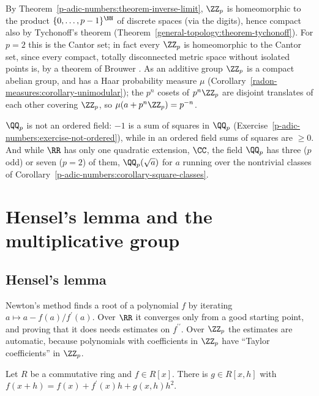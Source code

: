 \begin{remark}\label{p-adic-numbers:remark-cantor}
By Theorem~\ref{p-adic-numbers:theorem-inverse-limit}, $\ZZ_p$ is homeomorphic to the product $\{0, \ldots, p - 1\}^{\NN}$ of discrete spaces (via the digits), hence compact also by Tychonoff's theorem
(Theorem~\ref{general-topology:theorem-tychonoff}). For $p = 2$ this is the Cantor set; in fact every $\ZZ_p$ is homeomorphic to the Cantor set, since every compact, totally disconnected metric space
without isolated points is, by a theorem of Brouwer \cite{engelking-general-topology}. As an additive group $\ZZ_p$ is a compact abelian group, and has a Haar probability measure $\mu$ (Corollary~\ref{radon-measures:corollary-unimodular}); the $p^n$ cosets of $p^n\ZZ_p$ are disjoint
translates of each other covering $\ZZ_p$, so $\mu(a + p^n\ZZ_p) = p^{-n}$.
\end{remark}

\begin{counterexample}\label{p-adic-numbers:counterexample-q-p-not-ordered}
$\QQ_p$ is not an ordered field: $-1$ is a sum of squares in $\QQ_p$ (Exercise~\ref{p-adic-numbers:exercise-not-ordered}), while in an ordered field sums of squares are $\geq 0$. And while $\RR$ has only one quadratic extension, $\CC$, the field $\QQ_p$ has three
($p$ odd) or seven ($p = 2$) of them, $\QQ_p(\sqrt{a})$ for $a$ running over the nontrivial classes of Corollary~\ref{p-adic-numbers:corollary-square-classes}.
\end{counterexample}

\section{Hensel's lemma and the multiplicative group}\label{p-adic-numbers:section-hensel}

\subsection{Hensel's lemma}\label{p-adic-numbers:subsection-hensel}

Newton's method finds a root of a polynomial $f$ by iterating $a \mapsto a - f(a)/f^{\prime}(a)$. Over $\RR$ it converges only from a good starting point, and proving that it does needs estimates on
$f^{\prime\prime}$. Over $\ZZ_p$ the estimates are automatic, because polynomials with coefficients in $\ZZ_p$ have ``Taylor coefficients'' in $\ZZ_p$.

\begin{lemma}\label{p-adic-numbers:lemma-taylor}
Let $R$ be a commutative ring and $f \in R[x]$. There is $g \in R[x, h]$ with $f(x + h) = f(x) + f^{\prime}(x)h + g(x, h)h^2$.
\end{lemma}

